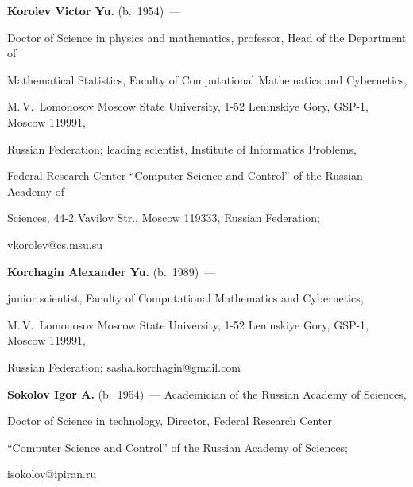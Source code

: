 \Contr








\noindent


\textbf{Korolev Victor Yu.} (b.\ 1954)~---


Doctor of Science in physics and mathematics, professor, Head of the Department of 


Mathematical Statistics, Faculty of Computational Mathematics and Cybernetics, 


 M.\,V.~Lomonosov Moscow State University, 1-52 Leninskiye Gory, GSP-1, Moscow 119991, 


 Russian Federation; leading scientist, Institute of Informatics Problems, 


 Federal Research Center ``Computer Science and Control'' of the Russian Academy of 


 Sciences, 44-2 Vavilov Str., Moscow 119333,  Russian Federation; 


 vkorolev@cs.msu.su





\vspace*{3pt}





\noindent


\textbf{Korchagin Alexander Yu.} (b.\ 1989)~---


junior scientist, Faculty of Computational Mathematics and Cybernetics, 


M.\,V.~Lomonosov Moscow State University, 1-52 Leninskiye Gory, GSP-1, Moscow 119991, 


Russian Federation; sasha.korchagin@gmail.com








\vspace*{3pt}





\noindent


\textbf{Sokolov Igor A.} (b.\ 1954)~--- Academician of the Russian Academy of Sciences, 


Doctor of Science in technology, Director, Federal Research Center 


``Computer Science and Control'' of the Russian Academy of Sciences; 


isokolov@ipiran.ru





\label{end\stat}








\renewcommand{\bibname}{\protect\rm Литература}


